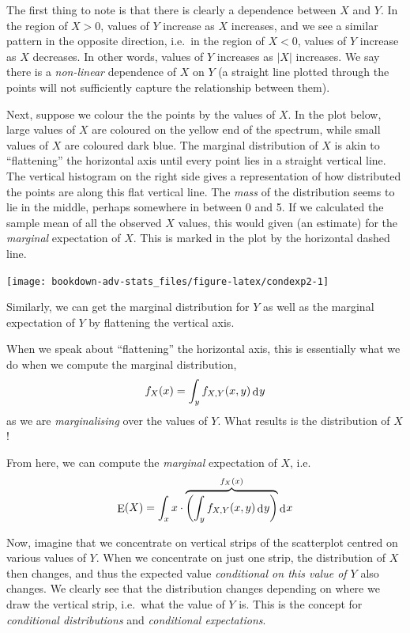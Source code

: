 \documentclass[
]{book}
\DeclareMathOperator{\E}{E}
\DeclareMathOperator{\dd}{d}
\newcommand{\dint}{\dd\hspace{0.5pt}\!}
\theoremstyle{definition}
\theoremstyle{definition}
\theoremstyle{definition}
\theoremstyle{definition}
\theoremstyle{remark}
\begin{document}
The first thing to note is that there is clearly a dependence between \(X\) and \(Y\).
In the region of \(X>0\), values of \(Y\) increase as \(X\) increases, and we see a similar pattern in the opposite direction, i.e.~in the region of \(X<0\), values of \(Y\) increase as \(X\) decreases.
In other words, values of \(Y\) increases as \(|X|\) increases.
We say there is a \emph{non-linear} dependence of \(X\) on \(Y\) (a straight line plotted through the points will not sufficiently capture the relationship between them).

Next, suppose we colour the the points by the values of \(X\).
In the plot below, large values of \(X\) are coloured on the yellow end of the spectrum, while small values of \(X\) are coloured dark blue.
The marginal distribution of \(X\) is akin to ``flattening'' the horizontal axis until every point lies in a straight vertical line.
The vertical histogram on the right side gives a representation of how distributed the points are along this flat vertical line.
The \emph{mass} of the distribution seems to lie in the middle, perhaps somewhere in between 0 and 5.
If we calculated the sample mean of all the observed \(X\) values, this would given (an estimate) for the \emph{marginal} expectation of \(X\).
This is marked in the plot by the horizontal dashed line.

\begin{center}\texttt{[image: bookdown-adv-stats\_files/figure-latex/condexp2-1]} \end{center}

Similarly, we can get the marginal distribution for \(Y\) as well as the marginal expectation of \(Y\) by flattening the vertical axis.

When we speak about ``flattening'' the horizontal axis, this is essentially what we do when we compute the marginal distribution,
\[
f_X(x) = \int_y f_{X,Y}(x,y) \dint y
\]
as we are \emph{marginalising} over the values of \(Y\).
What results is the distribution of \(X\)!

From here, we can compute the \emph{marginal} expectation of \(X\), i.e.
\[
\E(X) = \int_x x \cdot \overbrace{\left( \int_y f_{X,Y}(x,y) \dint y \right)}^{f_X(x)} \dint x
\]

Now, imagine that we concentrate on vertical strips of the scatterplot centred on various values of \(Y\).
When we concentrate on just one strip, the distribution of \(X\) then changes, and thus the expected value \emph{conditional on this value of \(Y\)} also changes.
We clearly see that the distribution changes depending on where we draw the vertical strip, i.e.~what the value of \(Y\) is.
This is the concept for \emph{conditional distributions} and \emph{conditional expectations}.
\end{document}
